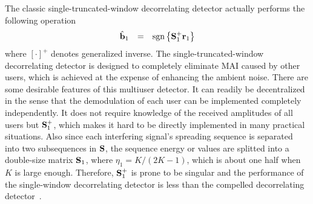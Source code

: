\documentclass[a4paper,10pt,fleqn, twocolumn]{IEEETran}
\newcommand{\br}{{\mathbf r}}
\newcommand{\bb}{{\bf b}}
\newcommand{\bS}{{\bf S}}
\begin{document}
The classic single-truncated-window decorrelating detector
actually performs the following operation
\begin{equation}
\begin{array}{rcl}
\hat{\bb}_1&=&\mbox{sgn}\left\{\bS_1^{+}\br_1\right\}
\end{array}\label{single-window}
\end{equation}
\noindent where $\left[\cdot\right]^+$ denotes generalized
inverse. The single-truncated-window decorrelating detector is
designed to completely eliminate MAI caused by other users, which
is achieved at the expense of enhancing the ambient noise. There
are some desirable features of this multiuser detector. It can
readily be decentralized in the sense that the demodulation of
each user can be implemented completely independently. It does not
require knowledge of the received amplitudes of all users but
$\bS_1^+$, which makes it hard to be directly implemented in many
practical situations. Also since each interfering signal's
spreading sequence is separated into two subsequences in $\bS$,
the sequence energy or values are splitted into a double-size
matrix $\bS_1$, where $\eta_1=K/(2K-1)$, which is about one half
when $K$ is large enough. Therefore, $\bS_1^+$ is prone to be
singular and the performance of the single-window decorrelating
detector is less than the compelled decorrelating
detector~\cite{Verd98}.
\end{document}
